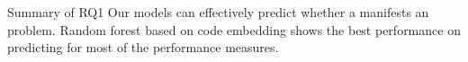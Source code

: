 




\vspace{0.5cm}
\begin{Summary}{Summary of RQ1}{}
Our models can effectively predict whether a \instance manifests an \inconsistent problem. Random forest based on code embedding shows the best performance on predicting \inconsistent for most of the performance measures.
\end{Summary}


